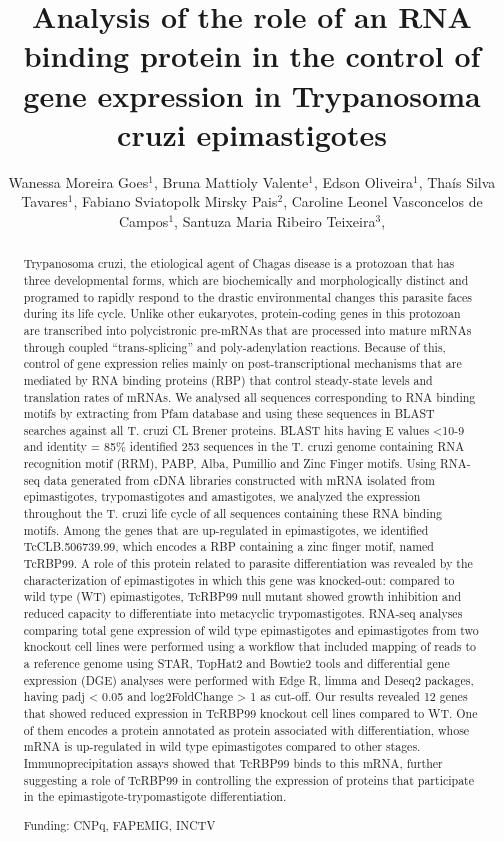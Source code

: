 \documentclass[twoside]{article}
\title{\vspace{-15mm}\fontsize{24pt}{10pt}\selectfont\textbf{ Analysis of the role of an RNA binding protein in the control of gene expression in Trypanosoma cruzi epimastigotes }} %
\author{ Wanessa Moreira Goes$^{1}$, Bruna Mattioly Valente$^{1}$, Edson Oliveira$^{1}$, Thaís Silva Tavares$^{1}$, Fabiano Sviatopolk Mirsky Pais$^{2}$, Caroline Leonel Vasconcelos de Campos$^{1}$, Santuza Maria Ribeiro Teixeira$^{3}$, }
\affil{ 1 Universidade Federal de Minas Gerais

2 Centro de Pesquisa René Rachou FIOCRUZ

3 Institute of Biological Sciences  UFMG

 }
\date{}
\begin{document}
  
  
  \maketitle %
  
  
  \thispagestyle{fancy} %
  
  
  \begin{abstract}
  Trypanosoma cruzi, the etiological agent of Chagas disease is a protozoan that has three developmental forms, which are biochemically and morphologically distinct and programed to rapidly respond to the drastic environmental changes this parasite faces during its life cycle. Unlike other eukaryotes, protein-coding genes in this protozoan are transcribed into polycistronic pre-mRNAs that are processed into mature mRNAs through coupled “trans-splicing” and poly-adenylation reactions. Because of this, control of gene expression relies mainly on post-transcriptional mechanisms that are mediated by RNA binding proteins (RBP) that control steady-state levels and translation rates of mRNAs. We analysed all sequences corresponding to RNA binding motifs by extracting from Pfam database and using these sequences in BLAST searches against all T. cruzi CL Brener proteins. BLAST hits having E values <10-9 and identity = 85\% identified 253 sequences in the T. cruzi genome containing RNA recognition motif (RRM), PABP, Alba, Pumillio and Zinc Finger motifs. Using RNA-seq data generated from cDNA libraries constructed with mRNA isolated from epimastigotes, trypomastigotes and amastigotes, we analyzed the expression throughout the T. cruzi life cycle of all sequences containing these RNA binding motifs. Among the genes that are up-regulated in epimastigotes, we identified TcCLB.506739.99, which encodes a RBP containing a zinc finger motif, named TcRBP99. A role of this protein related to parasite differentiation was revealed by the characterization of epimastigotes in which this gene was knocked-out: compared to wild type (WT) epimastigotes, TcRBP99 null mutant showed growth inhibition and reduced capacity to differentiate into metacyclic trypomastigotes. RNA-seq analyses comparing total gene expression of wild type epimastigotes and epimastigotes from two knockout cell lines were performed using a workflow that included mapping of reads to a reference genome using STAR, TopHat2 and Bowtie2 tools and differential gene expression (DGE) analyses were performed with Edge R, limma and Deseq2 packages, having padj < 0.05 and log2FoldChange > 1 as cut-off. Our results revealed 12 genes that showed reduced expression in TcRBP99 knockout cell lines compared to WT. One of them encodes a protein annotated as protein associated with differentiation, whose mRNA is up-regulated in wild type epimastigotes compared to other stages. Immunoprecipitation assays showed that TcRBP99 binds to this mRNA, further suggesting a role of TcRBP99 in controlling the expression of proteins that participate in the epimastigote-trypomastigote differentiation.
  
  Funding: CNPq, FAPEMIG, INCTV \\ 
  \end{abstract}
  
\end{document}
